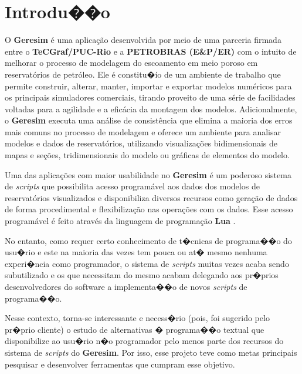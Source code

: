 \documentclass[dissertacao,modelo1,brazil]{ThesisPUC}
\begin{document}
\chapter{Introdu��o}

O \textbf{Geresim} \'{e} uma aplica\c{c}\~ao desenvolvida por meio de uma
parceria firmada entre o \textbf{TeCGraf/PUC-Rio}
e a \textbf{PETROBRAS (E\&P/ER)} com o intuito de melhorar o processo de modelagem do escoamento em meio 
poroso em reservat\'{o}rios de petr\'{o}leo. Ele \'{e} constitu�\'{i}o de um ambiente de trabalho que permite 
construir, alterar, manter, importar e exportar modelos num\'{e}ricos para os principais simuladores 
comerciais, tirando proveito de uma s\'{e}rie de facilidades voltadas para a agilidade e a efic\'{a}cia 
da montagem dos modelos. Adicionalmente, o \textbf{Geresim} executa uma an\'{a}lise de consist\^{e}ncia que 
elimina a maioria dos erros mais comuns no processo de modelagem e oferece um ambiente para 
analisar modelos e dados de reservat\'{o}rios, utilizando visualiza\c{c}\~{o}es bidimensionais de mapas 
e se\c{c}\~{o}es, tridimensionais do modelo ou gr\'{a}ficas de elementos do modelo\cite{Tecg06}. 

Uma das aplica\c{c}\~{o}es com maior usabilidade no \textbf{Geresim} \'{e} um poderoso sistema de \emph{scripts} que possibilita
acesso program\'{a}vel aos dados dos modelos de reservat\'{o}rios visualizados e disponibiliza diversos 
recursos como gera\c{c}\~{a}o de dados de forma procedimental e flexibiliza\c{c}\~{a}o
nas opera\c{c}\~{o}es com os dados.
Esse acesso program\'{a}vel \'{e} feito atrav\'{e}s da linguagem de programa\c{c}\~{a}o \textbf{Lua} \cite{Ieru03}.

No entanto, como requer certo conhecimento de t�cnicas de programa��o do usu�rio e este na maioria das
vezes tem pouca ou at� mesmo nenhuma experi�ncia como programador, 
o sistema de \emph{scripts} muitas vezes 
acaba sendo subutilizado e os que necessitam do mesmo acabam delegando aos pr�prios desenvolvedores 
do software a implementa��o de novos \emph{scripts} de programa��o.

Nesse contexto, torna-se interessante e necess�rio (pois, foi sugerido pelo pr�prio cliente) o estudo
de alternativas � programa��o textual %
que disponibilize ao usu�rio n�o programador pelo menos parte dos recursos do sistema de \emph{scripts}
do \textbf{Geresim}.
Por isso, esse projeto teve como metas principais pesquisar e desenvolver ferramentas
que cumpram esse objetivo.
\end{document}
